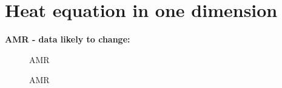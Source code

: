 \section{Heat equation in one dimension}

\begin{figure}[h]
    \centering
    
\end{figure}

\begin{figure}[h]
    \centering
    
\end{figure}

\begin{figure}[h]
    \centering
    
\end{figure}

\begin{figure}[h]
    \centering
    
\end{figure}

\textbf{AMR - data likely to change:}

\begin{figure}[h]
    \centering
    
    \caption{AMR}
\end{figure}

\begin{figure}[h]
    \centering
    
    \caption{AMR}
\end{figure}
